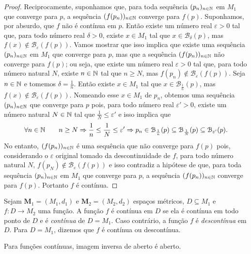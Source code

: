 \begin{proof}
	Reciprocamente, suponhamos que, para toda sequência $(p_n)_{n \in \mathbb{N}}$ em $M_1$ que converge para $p$, a sequência $(f(p_n))_{n \in \mathbb{N}}$ converge para $f(p)$. Suponhamos, por absurdo, que $f$ não é contínua em $p$. Então existe um número real $\varepsilon > 0$ tal que, para todo número real $\delta > 0$, existe $x \in M_1$ tal que $x \in \mathcal B_\delta(p)$, mas $f(x) \notin \mathcal B_\varepsilon(f(p))$. Vamos mostrar que isso implica que existe uma sequência $(p_n)_{n \in \mathbb{N}}$ em $M_1$ que converge para $p$, mas que a sequência $(f(p_n))_{n \in \mathbb{N}}$ não converge para $f(p)$; ou seja, que existe um número real $\varepsilon > 0$ tal que, para todo número natural $N$, existe $n \in \mathbb{N}$ tal que $n \geq N$, mas $f(p_n) \notin \mathcal B_\varepsilon(f(p))$. Seja $n \in \mathbb{N}$ e tomemos $\delta = \frac{1}{n}$. Então existe $x \in M_1$ tal que $x \in \mathcal B_\frac{1}{n}(p)$, mas $f(x) \notin \mathcal B_\varepsilon(f(p))$. Nomeando esse $x \in M_1$ de $p_n$, obtemos uma sequência $(p_n)_{n \in \mathbb{N}}$ que converge para $p$ pois, para todo número real $\varepsilon' > 0$, existe um número natural $N \in \mathbb{N}$ tal que $\frac{1}{N} \leq \varepsilon'$ e isso implica que
\begin{equation*}
	\forall n \in \mathbb{N} \qquad n \geq N \Rightarrow \frac{1}{n} \leq \frac{1}{N} \leq \varepsilon' \Rightarrow p_n \in \mathcal B_\frac{1}{n}(p) \subseteq \mathcal B_\frac{1}{N}(p) \subseteq \mathcal B_{\varepsilon'}(p).
	\end{equation*}
	No entanto, $(f(p_n))_{n \in \mathbb{N}}$ é uma sequência que não converge para $f(p)$ pois, considerando o $\varepsilon$ original tomado da descontinuidade de $f$, para todo número natural $N$, $f(p_N) \notin \mathcal B_\varepsilon(f(p))$ e isso contradiz a hipótese de que, para toda sequência $(p_n)_{n \in \mathbb{N}}$ em $M_1$ que converge para $p$, a sequência $(f(p_n))_{n \in \mathbb{N}}$ converge para $f(p)$. Portanto $f$ é contínua.	
\end{proof}

\begin{defi}
	Sejam $\bm M_1 = (M_1,d_1)$ e $\bm M_2 = (M_2,d_2)$ espaços métricos, $D \subseteq M_1$ e $f: D \to M_2$ uma função. A função $f$ é contínua em $D$ se ela é contínua em todo ponto de $D$ e é \emph{contínua} de $D = M_1$. Caso contrário, a função $f$ é \emph{descontínua} em $D$. Para $D=M_1$, dizemos que $f$ é contínua ou descontínua.
\end{defi}

\begin{prop}
	Para funções contínuas, imagem inversa de aberto é aberto.
\end{prop}



